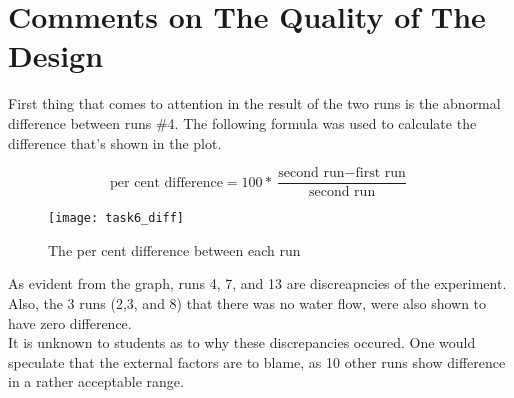 \newpage
\section{Comments on The Quality of The Design}

First thing that comes to attention in the result of the two runs is the abnormal difference between runs \#4. The following formula was used to calculate the difference that's shown in the plot.

$$
\text{per cent difference} = 100*\frac{\text{second run} - \text{first run}}{\text{second run}}
$$

\begin{figure}[!h]
\begin{center}
\texttt{[image: task6\_diff]}
\end{center}
\caption{The per cent difference between each run}
\end{figure}
As evident from the graph, runs 4, 7, and 13 are discreapncies of the experiment. Also, the 3 runs (2,3, and 8) that there was no water flow, were also shown to have zero difference.\\

It is unknown to students as to why these discrepancies occured. One would speculate that the external factors are to blame, as 10 other runs show difference in a rather acceptable range.
